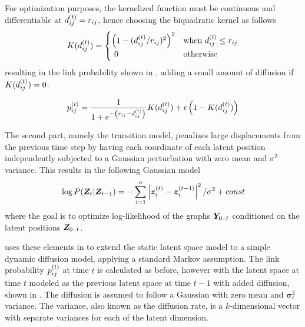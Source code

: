     For optimization purposes, the kernelized function must be continuous and differentiable at $\sub(d)^\t=\sub(r)$, hence choosing the biquadratic kernel as follows
    \begin{equation}\label{eq:biquadratic-kernel}
        K(\sub(d)^\t)=
        \begin{cases}
            \left(1-(\sub(d)^\t/\sub(r))^2\right)^2 & \text{when } \sub(d)^\t \leq \sub(r) \\
            \ 0 & \text{otherwise}
        \end{cases}
    \end{equation}
    resulting in the link probability shown in , adding a small amount of diffusion if $K(\sub(d)^\t)=0$.
    
    \begin{equation}\label{eq:dsnl-link-proba}
        \sub(p)^\t=\frac{1}{1 + e^{-\left(\sub(r)-\sub(d)^\t\right)}} K(\sub(d)^\t) + \epsilon\left(1-K(\sub(d)^\t)\right)
    \end{equation}
    
    The second part, namely the transition model, penalizes large displacements from the previous time step by having each coordinate of each latent position independently subjected to a Gaussian perturbation with zero mean and $\sigma^2$ variance. This results in the following Gaussian model
    \begin{equation}\label{eq:dsnl-transition}
        \log P(\bm{Z}_t|\bm{Z}_{t-1}) = -\sum_{i=1}^n \left|\bm{z}_i^{(t)}-\bm{z}_i^{(t-1)}\right|^2 / \sigma^2 + const
    \end{equation}
    where the goal is to optimize log-likelihood of the graphs $\bm{Y}_{0..t}$ conditioned on the latent positions $\bm{Z}_{0..t}$.
    
    \citeauthor{zangenberg2018a} uses these elements in \cite{zangenberg2018a} to extend the static latent space model to a simple dynamic diffusion model, applying a standard Markov assumption.
    The link probability $\sub(p)^\t$ at time $t$ is calculated as before, however with the latent space at time $t$ modeled as the previous latent space at time $t-1$ with added diffusion, shown in . The diffusion is assumed to follow a Gaussian with zero mean and $\bm{\sigma}_\epsilon^2$ variance. The variance, also known as the diffusion rate, is a $k$-dimensional vector with separate variances for each of the latent dimension.
    
